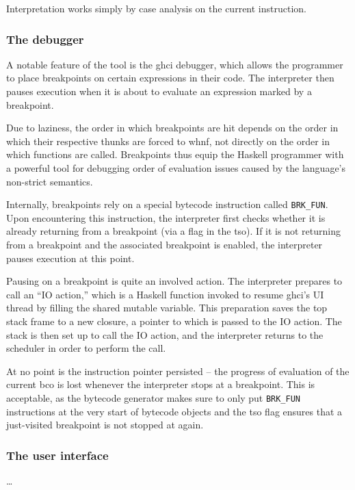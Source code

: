 \documentclass[thesis=B,english]{FITthesis}[2019/12/23]
\begin{document}
Interpretation works simply by case analysis on the current instruction.

\subsubsection{The debugger}
A notable feature of the tool is the \acrshort{ghci} debugger, which allows the
programmer to place breakpoints on certain expressions in their code. The
interpreter then pauses execution when it is about to evaluate an expression
marked by a breakpoint.

Due to laziness, the order in which breakpoints are hit depends on the order in
which their respective thunks are forced to \acrshort{whnf}, not directly on
the order in which functions are called. Breakpoints thus equip the Haskell
programmer with a powerful tool for debugging order of evaluation issues caused
by the language's non-strict semantics.

Internally, breakpoints rely on a special bytecode instruction called
\texttt{BRK\_FUN}. Upon encountering this instruction, the interpreter first
checks whether it is already returning from a breakpoint (via a flag in the
\acrshort{tso}). If it is not returning from a breakpoint and the associated
breakpoint is enabled, the interpreter pauses execution at this point.

Pausing on a breakpoint is quite an involved action. The interpreter prepares
to call an ``IO action,'' which is a Haskell function invoked to resume
\acrshort{ghci}'s UI thread by filling the shared mutable variable. This
preparation saves the top stack frame to a new closure, a pointer to which is
passed to the IO action. The stack is then set up to call the IO action, and
the interpreter returns to the scheduler in order to perform the call.

At no point is the instruction pointer persisted -- the progress of evaluation
of the current \acrshort{bco} is lost whenever the interpreter stops at a
breakpoint. This is acceptable, as the bytecode generator makes sure to only
put \texttt{BRK\_FUN} instructions at the very start of bytecode objects and
the \acrshort{tso} flag ensures that a just-visited breakpoint is not stopped
at again.

\subsubsection{The user interface}
\ldots
\end{document}
